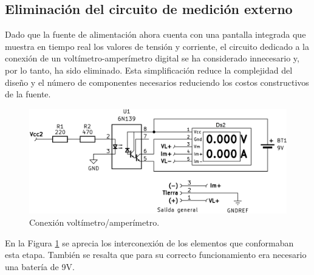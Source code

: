 \subsection{Eliminación del circuito de medición externo}
Dado que la fuente de alimentación ahora cuenta con una pantalla integrada que muestra en tiempo real los valores de tensión y corriente, el circuito dedicado a la conexión de un voltímetro-amperímetro digital se ha considerado innecesario y, por lo tanto, ha sido eliminado. Esta simplificación reduce la complejidad del diseño y el número de componentes necesarios reduciendo los costos constructivos de la fuente.
\begin{figure}[H]
    \centering
    \includegraphics[scale=0.2]{./imagenes/voltimetro_amperimetro.jpg}
    \caption{Conexión voltímetro/amperímetro.}
    \label{F:voltimetro_amperimetro}
\end{figure}
En la Figura \ref{F:voltimetro_amperimetro} se aprecia los interconexión de los elementos que conformaban esta etapa. También se resalta que para su correcto funcionamiento era necesario una batería de 9V.

